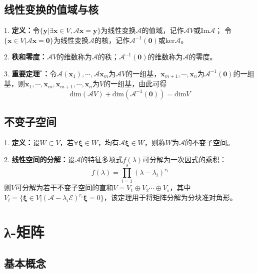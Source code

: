 \subsection{线性变换的值域与核}

1. \textbf{定义：}令$\{\boldsymbol{y}|\exists \boldsymbol{x} \in V, \mathscr{A}\boldsymbol{x}=\boldsymbol{y}\}$为线性变换$\mathscr{A}$的值域，记作$\mathscr{A}V$或Im$\mathscr{A}$；
令$\{\boldsymbol{x}\in V | \mathscr{A}\boldsymbol{x}=\boldsymbol{0}\}$为线性变换$\mathscr{A}$的核，记作$\mathscr{A}^{-1}(\boldsymbol{0})$或ker$\mathscr{A}$。

2. \textbf{秩和零度：}$\mathscr{A}V$的维数称为$\mathscr{A}$的秩；$\mathscr{A}^{-1}(\boldsymbol{0})$的维数称为$\mathscr{A}$的零度。

3. \textbf{重要定理$^*$：}令$\mathscr{A}(\boldsymbol{x}_1),\cdots,\mathscr{A}\boldsymbol{x}_m$为$\mathscr{A}V$的一组基，$\boldsymbol{x}_{m+1},\cdots,\boldsymbol{x}_n$为$\mathscr{A}^{-1}(\boldsymbol{0})$的一组基，则$\boldsymbol{x}_1,\cdots,\boldsymbol{x}_m,\boldsymbol{x}_{m+1},\cdots,\boldsymbol{x}_n$为$V$的一组基，由此可得
\begin{equation*}
    \text{dim}(\mathscr{A}V)+\text{dim}\left(\mathscr{A}^{-1}(\boldsymbol{0})\right)=\text{dim}V
\end{equation*}

\subsection{不变子空间}

1. \textbf{定义：}设$W \subset V$，若$\forall \boldsymbol{\xi}\in W $，均有$\mathscr{A}\boldsymbol{\xi}\in W$，则称$W$为$\mathscr{A}$的不变子空间。

2. \textbf{线性空间的分解：}设$\mathscr{A}$的特征多项式$f(\lambda)$可分解为一次因式的乘积：
\begin{equation*}
    f(\lambda)=\prod\limits_{i=1}^s(\lambda-\lambda_i)^{r_i}
\end{equation*}
则$V$可分解为若干不变子空间的直和$V=V_1\oplus V_2\cdots\oplus V_s$，其中$V_i=\{\boldsymbol{\xi}\in V|(\mathscr{A}-\lambda_i\mathscr{E})^{r_i}\boldsymbol{\xi}=0\}$，该定理用于将矩阵分解为分块准对角形。

\section{λ-矩阵}

\subsection{基本概念}

